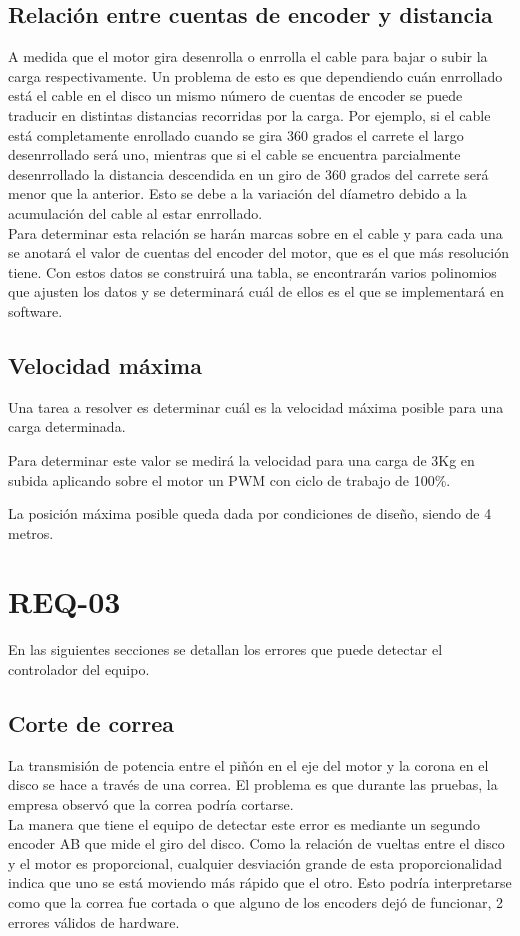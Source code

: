 \subsection{Relación entre cuentas de encoder y distancia}
A medida que el motor gira desenrolla o enrrolla el cable para bajar o subir la carga respectivamente. Un problema de esto es que dependiendo cuán enrrollado está el cable en el disco un mismo número de cuentas de encoder se puede traducir en distintas distancias recorridas por la carga. Por ejemplo, si el cable está completamente enrollado cuando se gira 360 grados el carrete el largo desenrrollado será uno, mientras que si el cable se encuentra parcialmente desenrrollado la distancia descendida en un giro de 360 grados del carrete será menor que la anterior. Esto se debe a la variación del díametro debido a la acumulación del cable al estar enrrollado.\\
Para determinar esta relación se harán marcas sobre en el cable y para cada una se anotará el valor de cuentas del encoder del motor, que es el que más resolución tiene. Con estos datos se construirá una tabla, se encontrarán varios polinomios que ajusten los datos y se determinará cuál de ellos es el que se implementará en software.

\subsection{Velocidad máxima}
Una tarea a resolver es determinar cuál es la velocidad máxima posible para una carga determinada.

Para determinar este valor se medirá la velocidad para una carga de 3Kg en subida aplicando sobre el motor un PWM con ciclo de trabajo de 100\%.

La posición máxima posible queda dada por condiciones de diseño, siendo de 4 metros.

\section{REQ-03} \label{sec:\thesection}
En las siguientes secciones se detallan los errores que puede detectar el controlador del equipo.

\subsection{Corte de correa}
La transmisión de potencia entre el piñón en el eje del motor y la corona en el disco se hace a través de una correa. El problema es que durante las pruebas, la empresa observó que la correa podría cortarse. \\
La manera que tiene el equipo de detectar este error es mediante un segundo encoder AB que mide el giro del disco. Como la relación de vueltas entre el disco y el motor es proporcional, cualquier desviación grande de esta proporcionalidad indica que uno se está moviendo más rápido que el otro. Esto podría interpretarse como que la correa fue cortada o que alguno de los encoders dejó de funcionar, 2 errores válidos de hardware.

